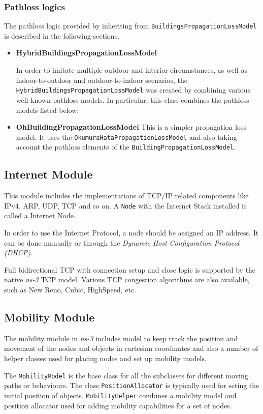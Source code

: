 \subsubsection{Pathloss logics}
The pathloss logic provided by inheriting from \texttt{BuildingsPropagationLossModel}
is described in the following sections.
\begin{itemize}
  \item \textbf{HybridBuildingsPropagationLossModel}

  In order to imitate multiple outdoor and interior circumstances, as well as indoor-to-outdoor 
  and outdoor-to-indoor scenarios, the \texttt{HybridBuildingsPropagationLossModel} was created by 
  combining various well-known pathloss models. In particular, this class combines the pathloss 
  models listed below:

  \item \textbf{OhBuildingPropagationLossModel}
  This is a simpler propagation loss model. It uses the \texttt{OkumuraHataPropagationLossModel} and 
  also taking account the pathloss elements of the \texttt{BuildingPropagationLossModel}.
\end{itemize}

\subsection{Internet Module}
This module includes the implementations of TCP/IP related components like IPv4, ARP, UDP, TCP and so on.
A \texttt{Node} with the Internet Stack installed is called a Internet Node.

In order to use the Internet Protocol, a node should be assigned an IP address. It can be done manually
or through the \textit{Dynamic Host Configuration Protocol (DHCP)}.

Full bidirectional TCP with connection setup and close logic is supported by the native \textit{ns-3} TCP model.
Various TCP congestion algorithms are also available, such as New Reno, Cubic, HighSpeed, etc.


\subsection{Mobility Module}
The mobility module in \textit{ns-3} includes model to keep track the position and movement of the nodes and objects 
in cartesian coordinates and also a number of helper classes used for placing nodes and set up mobility 
models.

The \texttt{MobilityModel} is the base class for all the subclasses for different moving paths or behaviours.
The class \texttt{PositionAllocator} is typically used for seting the initial position of objects. \texttt{MobilityHelper}
combines a mobility model and position allocator used for adding mobility capabilities for a set 
of nodes.

